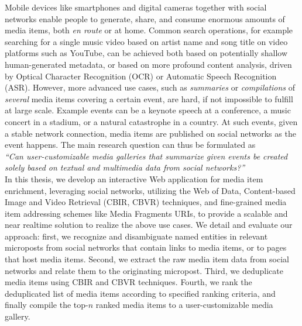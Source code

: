 


\begin{abstracts}        %
Mobile devices like smartphones and digital cameras together with social networks enable people to generate,
share, and consume enormous amounts of media items, both \textit{en route} or at home.
Common search operations, for example searching for a single music video based on artist name
and song title on video platforms such as YouTube,
can be achieved both based on potentially shallow human-generated metadata,
or based on more profound content analysis,
driven by Optical Character Recognition (OCR) or Automatic Speech Recognition (ASR).
However, more advanced use cases, such as \emph{summaries} or \emph{compilations} of \emph{several} media items
covering a certain event, are hard, if not impossible to fulfill at large scale.
Example events can be a keynote speech at a conference,
a music concert in a stadium, or a natural catastrophe in a country.
At such events, given a stable network connection,
media items are published on social networks as the event happens.
The main research question can thus be formulated as\\

\noindent \textit{``Can user-customizable media galleries that summarize given events
be created solely based on textual and multimedia data from social networks?''}\\

In this thesis, we develop an interactive Web application for media item enrichment,
leveraging social networks, utilizing the Web of Data,
Content-based Image and Video Retrieval (CBIR, CBVR) techniques,
and fine-grained media item addressing schemes like Media Fragments URIs,
to provide a scalable and near realtime solution to realize the above use cases.
We detail and evaluate our approach:
first, we recognize and disambiguate named entities in relevant microposts
from social networks that contain links to media items, or to pages that host media items.
Second, we extract the raw media item data from social networks and relate them to the originating micropost.
Third, we deduplicate media items using CBIR and CBVR techniques.
Fourth, we rank the deduplicated list of media items according to specified ranking criteria,
and finally compile the top-$n$ ranked media items to a user-customizable media gallery.

\end{abstracts}

